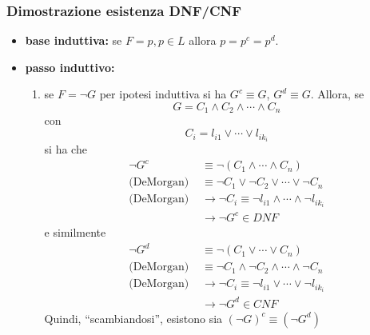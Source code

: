 \subsubsection{Dimostrazione esistenza DNF/CNF}
\begin{itemize}
        \item \textbf{base induttiva:} se $F = p, p \in L$ allora $p = p^c = p^d$. 
        \item \textbf{passo induttivo:} 
                \begin{enumerate}
                        \item se $F = \neg G$ per ipotesi induttiva si ha $G^c \equiv G$, $G^d \equiv G$. 
                                Allora, se 
                        \[
                                G = C_1 \land C_2 \land \cdots \land C_n
                        \]
                                con 
                                $$
                                C_i = l_{i1} \lor \cdots \lor l_{ik_i}
                                $$
                                si ha che 
                                \begin{align*}
                                        \neg G^c &\equiv \neg (C_1 \land \cdots \land C_n) \\
                                        \text{(DeMorgan) } &\equiv \neg C_1 \lor \neg C_2 \lor \cdots \lor \neg C_n \\
                                        \text{(DeMorgan) } &\rightarrow \neg C_i \equiv \neg l_{i1} \land \cdots \land \neg l_{ik_i} \\
                                                           & \rightarrow \neg G^c \in DNF 
                                \end{align*}
                                e similmente
                                \begin{align*}
                                        \neg G^d &\equiv \neg (C_1 \lor \cdots \lor C_n) \\
                                        \text{(DeMorgan) } &\equiv \neg C_1 \land \neg C_2 \land \cdots \land \neg C_n \\
                                        \text{(DeMorgan) } &\rightarrow \neg C_i \equiv \neg l_{i1} \lor \cdots \lor \neg l_{ik_i} \\
                                                           & \rightarrow \neg G^d \in CNF
                                \end{align*}
                                Quindi, ``scambiandosi'', esistono sia $(\neg G)^c \equiv (\neg G^d)$ 

\end{enumerate}
\end{itemize}
